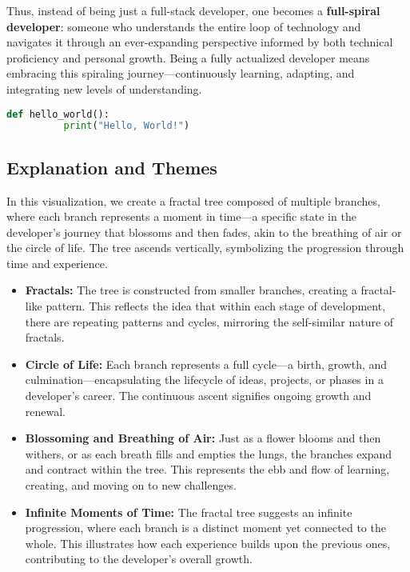 \documentclass[../../main.tex]{subfiles}
\begin{document}
    Thus, instead of being just a full-stack developer, one becomes a \textbf{full-spiral developer}: someone who understands the entire loop of technology and navigates it through an ever-expanding perspective informed by both technical proficiency and personal growth. Being a fully actualized developer means embracing this spiraling journey—continuously learning, adapting, and integrating new levels of understanding.


    \begin{lstlisting}[language=Python]
      def hello_world():
          print("Hello, World!")
      \end{lstlisting}

    \subsection*{Explanation and Themes}

    In this visualization, we create a fractal tree composed of multiple branches, where each branch represents a moment in time—a specific state in the developer’s journey that blossoms and then fades, akin to the breathing of air or the circle of life. The tree ascends vertically, symbolizing the progression through time and experience.

    \begin{itemize}
        \item \textbf{Fractals:} The tree is constructed from smaller branches, creating a fractal-like pattern. This reflects the idea that within each stage of development, there are repeating patterns and cycles, mirroring the self-similar nature of fractals.
        \item \textbf{Circle of Life:} Each branch represents a full cycle—a birth, growth, and culmination—encapsulating the lifecycle of ideas, projects, or phases in a developer’s career. The continuous ascent signifies ongoing growth and renewal.
        \item \textbf{Blossoming and Breathing of Air:} Just as a flower blooms and then withers, or as each breath fills and empties the lungs, the branches expand and contract within the tree. This represents the ebb and flow of learning, creating, and moving on to new challenges.
        \item \textbf{Infinite Moments of Time:} The fractal tree suggests an infinite progression, where each branch is a distinct moment yet connected to the whole. This illustrates how each experience builds upon the previous ones, contributing to the developer’s overall growth.
    \end{itemize}
\end{document}
